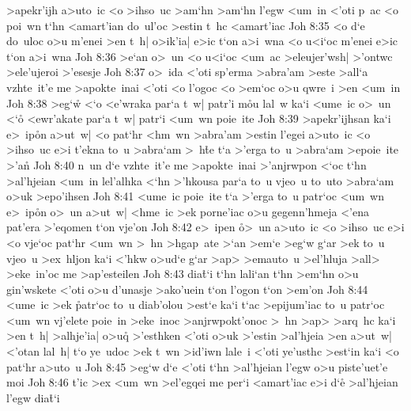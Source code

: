 >apekr'ijh
a>uto~ic
<o
>ihso~uc
>am`hn
>am`hn
l'egw
<um~in
<'oti
p~ac
<o
poi~wn
t`hn
<amart'ian
do~ul'oc
>estin
t~hc
<amart'iac\bibvsend
\vs Joh 8:35
<o
d`e
do~uloc
o>u
m'enei
>en
t~h|
o>ik'ia|
e>ic
t`on
a>i~wna
<o
u<i`oc
m'enei
e>ic
t`on
a>i~wna\bibvsend
\vs Joh 8:36
>e`an
o>~un
<o
u<i`oc
<um~ac
>eleujer'wsh|
>'ontwc
>ele'ujeroi
>'esesje\bibvsend
\vs Joh 8:37
o>~ida
<'oti
sp'erma
>abra'am
>este
>all`a
vzhte~it'e
me
>apokte~inai
<'oti
<o
l'ogoc
<o
>em`oc
o>u
qwre~i
>en
<um~in\bibvsend
\vs Joh 8:38
>eg`w\r{}
<`o
<e'wraka
par`a
t~w|
patr'i
m\r{o}u
lal~w
ka`i
<ume~ic
o>~un
<`o\r{}
<ewr'akate
par`a
t~w|
patr`i
<um~wn
poie~ite\bibvsend
\vs Joh 8:39
>apekr'ijhsan
ka`i
e>~ip\r{o}n
a>ut~w|
<o
pat`hr
<hm~wn
>abra'am
>estin
l'egei
a>uto~ic
<o
>ihso~uc
e>i
t'ekna
to~u
>abra`am
>~h\r{t}e
t`a
>'erga
to~u
>abra`am
>epoie~ite
>'a\r{n}\bibvsend
{}
\vs Joh 8:40
n~un
d`e
vzhte~it'e
me
>apokte~inai
>'anjrwpon
<`oc
t`hn
>al'hjeian
<um~in
lel'alhka
<`hn
>'hkousa
par`a
to~u
vjeo~u
to~uto
>abra`am
o>uk
>epo'ihsen\bibvsend
\vs Joh 8:41
<ume~ic
poie~ite
t`a
>'erga
to~u
patr`oc
<um~wn
e>~ip\r{o}n
o>~un
a>ut~w|
<hme~ic
>ek
porne'iac
o>u
gegenn'hmeja
<'ena
pat'era
>'eqomen
t`on
vje'on\bibvsend
\vs Joh 8:42
e>~ipen
\r{o}>~un
a>uto~ic
<o
>ihso~uc
e>i
<o
vje`oc
pat`hr
<um~wn
>~hn
>hgap~ate
>`an
>em`e
>eg`w
g`ar
>ek
to~u
vjeo~u
>ex~hljon
ka`i
<'hkw
o>ud`e
g`ar
>ap>
>emauto~u
>el'hluja
>all>
>eke~in'oc
me
>ap'esteilen\bibvsend
\vs Joh 8:43
dia\r{t}`i
t`hn
lali`an
t`hn
>em`hn
o>u
gin'wskete
<'oti
o>u
d'unasje
>ako'uein
t`on
l'ogon
t`on
>em'on\bibvsend
\vs Joh 8:44
<ume~ic
>ek
\r{p}atr`oc
to~u
diab'olou
>est`e
ka`i
t`ac
>epijum'iac
to~u
patr`oc
<um~wn
vj'elete
poie~in
>eke~inoc
>anjrwpokt'onoc
>~hn
>ap>
>arq~hc
ka`i
>en
t~h|
>alhje'ia|
o>u\r{q}
>'esthken
<'oti
o>uk
>'estin
>al'hjeia
>en
a>ut~w|
<'otan
lal~h|
t`o
ye~udoc
>ek
t~wn
>id'iwn
lale~i
<'oti
ye'usthc
>est`in
ka`i
<o
pat`hr
a>uto~u\bibvsend
\vs Joh 8:45
>eg`w
d`e
<'oti
t`hn
>al'hjeian
l'egw
o>u
piste'uet'e
moi\bibvsend
\vs Joh 8:46
t'ic
>ex
<um~wn
>el'egqei
me
per`i
<amart'iac
e>i
d`e\r{}
>al'hjeian
l'egw
dia\r{t}`i
